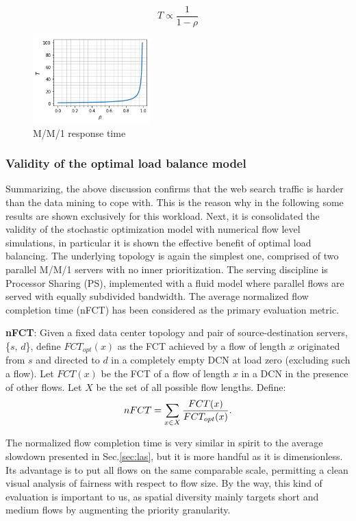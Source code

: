 \[
T \propto \dfrac{1}{1-\rho}
\]
\begin{figure}
	\centering
	\includegraphics[width=0.4\textwidth]{ChapterSpatialDiversityFramework/Figures/mm1-response-time}
	\caption{M/M/1 response time}
	\label{fig:mm1-responsetime}
\end{figure}
\subsubsection{Validity of the optimal load balance model}
Summarizing, the above discussion confirms that the web search traffic is harder than the data mining to cope with. This is the reason why in the following some results are shown exclusively for this workload. 
Next, it is consolidated the validity of the stochastic optimization model with numerical flow level simulations, in particular it is shown the effective benefit of optimal load balancing. The underlying topology is again the simplest one, comprised of two parallel M/M/1 servers with no inner prioritization. The serving discipline is Processor Sharing (PS), implemented with a fluid model where parallel flows are served with equally subdivided bandwidth. 
The average normalized flow completion time (nFCT) has been considered as the primary evaluation metric.
\smallskip
\begin{tcolorbox}[title=Definition]
	\textbf{nFCT}: Given a fixed data center topology and pair of source-destination servers, \{$s$, $d$\}, define $FCT_{opt}(x)$ as the FCT achieved by a flow of length $x$ originated from $s$ and directed to $d$ in a completely empty DCN at load zero (excluding such a flow). Let $FCT(x)$ be the FCT of a flow of length $x$ in a DCN in the presence of other flows. Let $X$ be the set of all possible flow lengths. Define:
	\[
	nFCT = \sum_{x \in X} \small \frac{FCT(x)}{FCT_{opt}(x)} \normalsize.
	\]
\end{tcolorbox}
\smallskip
The normalized flow completion time is very similar in spirit to the average slowdown presented in Sec.\ref{sec:las}, but it is more handful as it is dimensionless. Its advantage is to put all flows on the same comparable scale, permitting a clean visual analysis of fairness with respect to flow size. By the way, this kind of evaluation is important to us, as spatial diversity mainly targets short and medium flows by augmenting the priority granularity. \\
